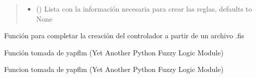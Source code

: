 \documentclass[letterpaper,10pt,spanish]{sphinxmanual}
\begin{document}
\begin{fulllineitems}
\begin{fulllineitems}
\begin{quote}
\begin{description}
\begin{itemize}
\item {} 
 (\sphinxstyleliteralemphasis{\sphinxupquote{, }}) \textendash{} Lista con la información necesaria para crear las reglas, defaults to None

\end{itemize}

\end{description}\end{quote}

\end{fulllineitems}


\begin{fulllineitems}
\label{\detokenize{codigos/rutinas_fuzzy:rutinas_fuzzy.FISParser.fis_to_json}}
Función para completar la creación del controlador a partir de un archivo .fis

\end{fulllineitems}


\begin{fulllineitems}
\label{\detokenize{codigos/rutinas_fuzzy:rutinas_fuzzy.FISParser.get_rules}}
Función tomada de yapflm (Yet Another Python Fuzzy Logic Module)

\end{fulllineitems}


\begin{fulllineitems}
\label{\detokenize{codigos/rutinas_fuzzy:rutinas_fuzzy.FISParser.get_system}}
Funcion tomada de yapflm (Yet Another Python Fuzzy Logic Module)

\end{fulllineitems}



\end{fulllineitems}
\end{document}
